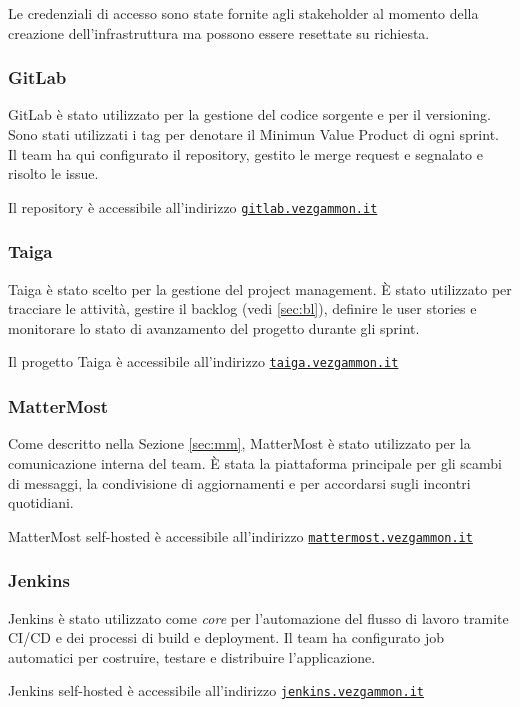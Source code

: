 \documentclass{article}
\begin{document}
Le credenziali di accesso sono state fornite agli stakeholder al momento della creazione dell'infrastruttura ma possono 
essere resettate su richiesta.

\subsubsection{GitLab}
GitLab è stato utilizzato per la gestione del codice sorgente e per il versioning. Sono stati utilizzati i tag per denotare 
il Minimun Value Product di ogni sprint. 
Il team ha qui configurato il repository, gestito le merge request e segnalato e risolto le issue.

Il repository è accessibile all'indirizzo \href{https://gitlab.vezgammon.it}{\texttt{gitlab.vezgammon.it}}  

\subsubsection{Taiga}
Taiga è stato scelto per la gestione del project management. È stato utilizzato per tracciare le attività, gestire il 
backlog (vedi \ref{sec:bl}), definire le user stories e monitorare lo stato di avanzamento del progetto durante gli sprint.

Il progetto Taiga è accessibile all'indirizzo \href{https://taiga.vezgammon.it}{\texttt{taiga.vezgammon.it}}

\subsubsection{MatterMost}
Come descritto nella Sezione \ref{sec:mm}, MatterMost è stato utilizzato per la comunicazione interna del team. È stata 
la piattaforma principale per gli scambi di messaggi, la condivisione di aggiornamenti e per accordarsi sugli incontri quotidiani.

MatterMost self-hosted è accessibile all'indirizzo \href{https://mattermost.vezgammon.it}{\texttt{mattermost.vezgammon.it}}

\newpage

\subsubsection{Jenkins}
Jenkins è stato utilizzato come \textit{core} per l'automazione del flusso di lavoro tramite CI/CD e dei processi di build 
e deployment. Il team ha configurato job automatici per costruire, testare e distribuire l'applicazione.

Jenkins self-hosted è accessibile all'indirizzo \href{https://jenkins.vezgammon.it}{\texttt{jenkins.vezgammon.it}}
\end{document}
